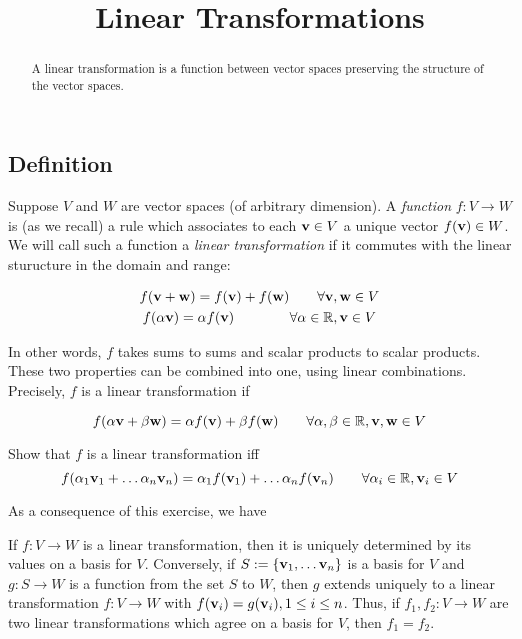 \documentclass{ximera}
\title{Linear Transformations}
\begin{document}
\begin{abstract}
  A linear transformation is a function between vector spaces preserving the structure of the vector spaces.
\end{abstract}
\maketitle

\subsection{Definition} Suppose $V$ and $W$ are vector spaces (of arbitrary dimension). A {\it function} $f:V\to W$ is (as we recall) a rule which associates to each ${\bf v}\in V$ a unique vector $f({\bf v})\in W$. We will call such a function a {\it linear transformation} if it commutes with the linear sturucture in the domain and range:

\begin{gather}
f({\bf v} + {\bf w}) = f({\bf v}) + f({\bf w})\qquad\forall {\bf v,w}\in V\\
f(\alpha{\bf v}) = \alpha f({\bf v})\qquad\qquad\forall \alpha\in\mathbb R, {\bf v}\in V
\end{gather}

In other words, $f$ takes sums to sums and scalar products to scalar products. These two properties can be combined into one, using linear combinations. Precisely, $f$ is a linear transformation if

\begin{equation}
f(\alpha{\bf v} + \beta{\bf w}) = \alpha f({\bf v}) + \beta f({\bf w})\qquad\forall \alpha,\beta\in\mathbb R, {\bf v}, {\bf w}\in V
\end{equation}

\begin{exercise} Show that $f$ is a linear transformation iff
\[
f(\alpha_1{\bf v}_1 +\dots \alpha_n{\bf v}_n) = \alpha_1 f({\bf v}_1) +\dots \alpha_n f({\bf v}_n)\qquad\forall \alpha_i\in\mathbb R, {\bf v}_i\in V
\]
\end{exercise}

As a consequence of this exercise, we have

\begin{corollary} If $f: V\to W$ is a linear transformation, then it is uniquely determined by its values on a basis for $V$. Conversely, if $S := \{{\bf v}_1,\dots {\bf v}_n\}$ is a basis for $V$ and $g:S\to W$ is a function from the set $S$ to $W$, then $g$ extends uniquely to a linear transformation $f:V\to W$ with $f({\bf v}_i) = g({\bf v}_i), 1\le i\le n$. Thus, if $f_1, f_2:V\to W$ are two linear transformations which agree on a basis for $V$, then $f_1 = f_2$.
\end{corollary}
\end{document}
